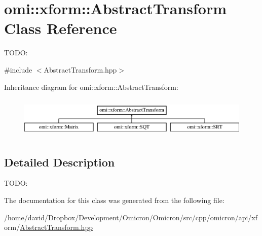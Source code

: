 \hypertarget{classomi_1_1xform_1_1_abstract_transform}{}\section{omi\+:\+:xform\+:\+:Abstract\+Transform Class Reference}
\label{classomi_1_1xform_1_1_abstract_transform}


T\+O\+DO\+:  




{\ttfamily \#include $<$Abstract\+Transform.\+hpp$>$}

Inheritance diagram for omi\+:\+:xform\+:\+:Abstract\+Transform\+:\begin{figure}[H]
\begin{center}
\leavevmode
\includegraphics[height=2.000000cm]{classomi_1_1xform_1_1_abstract_transform}
\end{center}
\end{figure}


\subsection{Detailed Description}
T\+O\+DO\+: 

The documentation for this class was generated from the following file\+:\begin{DoxyCompactItemize}
\item 
/home/david/\+Dropbox/\+Development/\+Omicron/\+Omicron/src/cpp/omicron/api/xform/\hyperlink{_abstract_transform_8hpp}{Abstract\+Transform.\+hpp}\end{DoxyCompactItemize}
